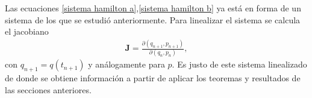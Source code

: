Las ecuaciones \eqref{sistema hamilton a},\eqref{sistema hamilton b} ya está en forma de un sistema de los que se estudió anteriormente. Para linealizar el sistema se calcula el jacobiano
\begin{eqnarray}
\mathbf{J}=\frac{\partial(q_{n+1},p_{n+1})}{\partial(q_{n},p_{n})},
\end{eqnarray}
con $q_{n+1}=q(t_{n+1})$ y análogamente para $p$. Es justo de este sistema linealizado de donde se obtiene información a partir de aplicar los teoremas y resultados de las secciones anteriores. 









